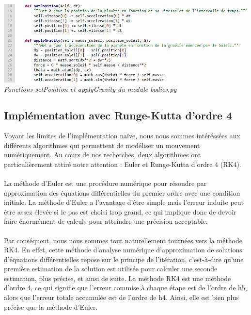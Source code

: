 \documentclass{article}
\begin{document}
        \begin{center}
            \includegraphics[scale=0.5]{naif.png} \\
            \emph{Fonctions setPosition et applyGravity du module bodies.py}
        \end{center}

    \subsection{Implémentation avec Runge-Kutta d'ordre 4}

        Voyant les limites de l'implémentation naïve, nous nous sommes intéréssées aux différents algorithmes qui permettent de modéliser un mouvement numériquement. Au cours de nos recherches, deux algorithmes ont particulièrement attiré notre attention : Euler et Runge-Kutta d'ordre 4 (RK4).

        \paragraph{}

         La méthode d'Euler est une procédure numérique pour résoudre par approximation des équations différentielles du premier ordre avec une condition initiale. La méthode d'Euler a l'avantage d'être simple mais l'erreur induite peut être assez élevée si le pas est choisi trop grand, ce qui implique donc de devoir faire énormément de calculs pour atteindre une précision acceptable.

          \paragraph{}

            Par conséquent, nous nous sommes tout naturellement tournées vers la méthode RK4. En effet, cette méthode d'analyse numérique d'approximation de solutions d'équations différentielles repose sur le principe de l'itération, c'est-à-dire qu'une première estimation de la solution est utilisée pour calculer une seconde estimation, plus précise, et ainsi de suite. La méthode RK4 est une méthode d'ordre 4, ce qui signifie que l'erreur commise à chaque étape est de l'ordre de h5, alors que l'erreur totale accumulée est de l'ordre de h4. Ainsi, elle est bien plus précise que la méthode d'Euler.
\end{document}
